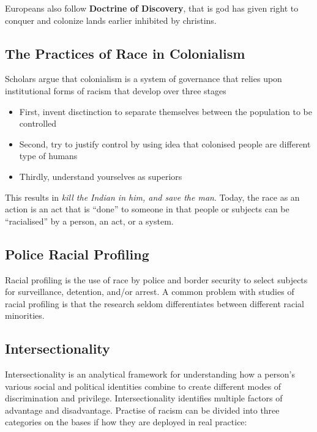 \documentclass[11pt]{article}
\begin{document}
Europeans also follow \textbf{Doctrine of Discovery}, that is god has given right to conquer and colonize lands earlier inhibited by christins.

\subsection{The Practices of Race in Colonialism}

Scholars argue that colonialism is a system of governance that relies upon institutional forms of racism that develop over three stages

\begin{itemize}
    \item First, invent disctinction to separate themselves between the population to be controlled
    
    \item Second, try to justify control by using idea that colonised people are different type of humans
    
    \item Thirdly, understand yourselves as superiors
\end{itemize}

This results in \textit{kill the Indian in him, and save the man}. Today, the race as an action is an act that is “done” to someone in that people or subjects can be “racialised” by a person, an act, or a system.

\subsection{Police Racial Profiling}

Racial profiling is the use of race by police and border security to select subjects for surveillance, detention, and/or arrest. A common problem with studies of racial profiling is that the research seldom differentiates between different racial minorities.

\subsection{Intersectionality}

Intersectionality is an analytical framework for understanding how a person's various social and political identities combine to create different modes of discrimination and privilege. Intersectionality identifies multiple factors of advantage and disadvantage. Practise of racism can be divided into three categories on the bases if how they are deployed in real practice:
\end{document}

